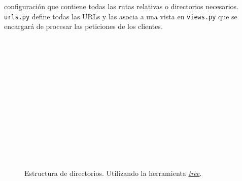 \documentclass[a4paper, 12pt]{book}
\begin{document}
\begin{itemize}
  configuraci\'on que contiene todas las rutas relativas o directorios necesarios. \texttt{urls.py} define todas las URLs y las asocia a una vista en
  \texttt{views.py} que se encargar\'a de procesar las peticiones de los clientes.\\\\\\\\\\\\\\\\\\\\\\\\\\\\
\end{itemize}


\begin{figure}
  \centering
  \caption{Estructura de directorios. Utilizando la herramienta \href{http://www.computerhope.com/unix/tree.htm}{\textit{tree}}.}
  \label{fig:arquitectura}
\end{figure}
\end{document}
